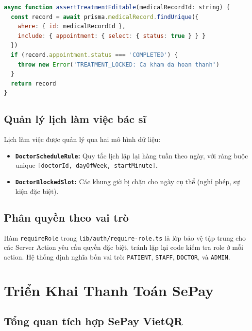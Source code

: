\documentclass[14pt,a4paper]{report}
\begin{document}
\begin{lstlisting}[language=JavaScript, caption={assertTreatmentEditable -- Kiểm tra khóa trước khi sửa}]
async function assertTreatmentEditable(medicalRecordId: string) {
  const record = await prisma.medicalRecord.findUnique({
    where: { id: medicalRecordId },
    include: { appointment: { select: { status: true } } }
  })
  if (record.appointment.status === 'COMPLETED') {
    throw new Error('TREATMENT_LOCKED: Ca kham da hoan thanh')
  }
  return record
}
\end{lstlisting}

\subsection{Quản lý lịch làm việc bác sĩ}

Lịch làm việc được quản lý qua hai mô hình dữ liệu:

\begin{itemize}
    \item \textbf{\texttt{DoctorScheduleRule}:} Quy tắc lịch lặp lại
          hàng tuần theo ngày, với ràng buộc unique
          \texttt{[doctorId, dayOfWeek, startMinute]}.
    \item \textbf{\texttt{DoctorBlockedSlot}:} Các khung giờ bị chặn
          cho ngày cụ thể (nghỉ phép, sự kiện đặc biệt).
\end{itemize}

\subsection{Phân quyền theo vai trò}

Hàm \texttt{requireRole} trong \texttt{lib/auth/require-role.ts} là
lớp bảo vệ tập trung cho các Server Action yêu cầu quyền đặc biệt,
tránh lặp lại code kiểm tra role ở mỗi action. Hệ thống định nghĩa
bốn vai trò: \texttt{PATIENT}, \texttt{STAFF}, \texttt{DOCTOR},
và \texttt{ADMIN}.

\section{Triển Khai Thanh Toán SePay}
\label{sec:sepay}

\subsection{Tổng quan tích hợp SePay VietQR}
\end{document}
